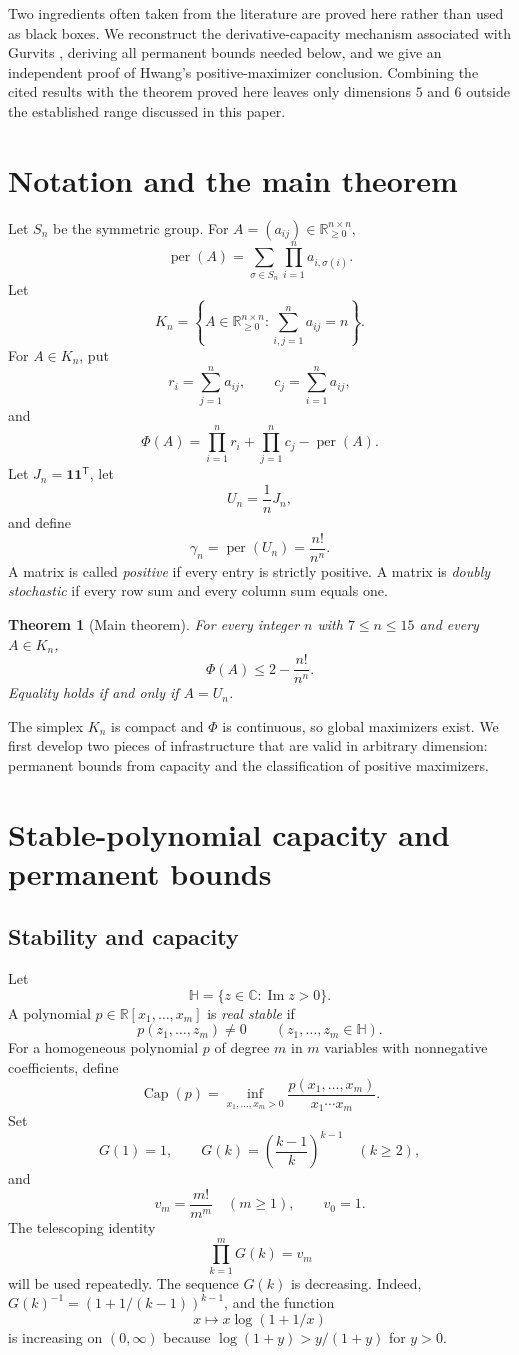 \documentclass[11pt]{article}
\newtheorem{theorem}{Theorem}[section]
\theoremstyle{definition}
\newcommand{\per}{\operatorname{per}}
\newcommand{\pcap}{\operatorname{Cap}}
\newcommand{\Rge}{\mathbb{R}_{\ge 0}}
\newcommand{\1}{\mathbf{1}}
\newcommand{\cH}{\mathbb{H}}
\begin{document}
Two ingredients often taken from the literature are proved here rather than
used as black boxes.  We reconstruct the derivative-capacity mechanism
associated with Gurvits \cite{Gurvits2008}, deriving all permanent bounds
needed below, and we give an independent proof of Hwang's positive-maximizer
conclusion.  Combining the cited results with the theorem proved here leaves
only dimensions $5$ and $6$ outside the established range discussed in this
paper.

\section{Notation and the main theorem}

Let $S_n$ be the symmetric group.  For $A=(a_{ij})\in\Rge^{n\times n}$,
\[
 \per(A)=\sum_{\sigma\in S_n}\prod_{i=1}^n a_{i,\sigma(i)}.
\]
Let
\[
 K_n=\left\{A\in\Rge^{n\times n}:\sum_{i,j=1}^n a_{ij}=n\right\}.
\]
For $A\in K_n$, put
\[
 r_i=\sum_{j=1}^n a_{ij},\qquad c_j=\sum_{i=1}^n a_{ij},
\]
and
\[
 \Phi(A)=\prod_{i=1}^n r_i+\prod_{j=1}^n c_j-\per(A).
\]
Let $J_n=\1\1^{\mathsf T}$, let
\[
 U_n=\frac1nJ_n,
\]
and define
\[
 \gamma_n=\per(U_n)=\frac{n!}{n^n}.
\]
A matrix is called \emph{positive} if every entry is strictly positive.  A matrix is \emph{doubly stochastic} if every row sum and every column sum equals one.

\begin{theorem}[Main theorem]\label{thm:main}
For every integer $n$ with $7\le n\le15$ and every $A\in K_n$,
\[
 \Phi(A)\le 2-\frac{n!}{n^n}.
\]
Equality holds if and only if $A=U_n$.
\end{theorem}

The simplex $K_n$ is compact and $\Phi$ is continuous, so global maximizers exist.  We first develop two pieces of infrastructure that are valid in arbitrary dimension: permanent bounds from capacity and the classification of positive maximizers.

\section{Stable-polynomial capacity and permanent bounds}\label{sec:capacity}

\subsection{Stability and capacity}

Let
\[
 \cH=\{z\in\mathbb C:\operatorname{Im}z>0\}.
\]
A polynomial $p\in\mathbb R[x_1,\dots,x_m]$ is \emph{real stable} if
\[
 p(z_1,\dots,z_m)\ne0
 \qquad(z_1,\dots,z_m\in\cH).
\]
For a homogeneous polynomial $p$ of degree $m$ in $m$ variables with nonnegative coefficients, define
\[
 \pcap(p)=\inf_{x_1,\dots,x_m>0}
 \frac{p(x_1,\dots,x_m)}{x_1\cdots x_m}.
\]
Set
\[
 G(1)=1,
 \qquad
 G(k)=\left(\frac{k-1}{k}\right)^{k-1}\quad(k\ge2),
\]
and
\[
 v_m=\frac{m!}{m^m}\quad(m\ge1),
 \qquad v_0=1.
\]
The telescoping identity
\[
 \prod_{k=1}^mG(k)=v_m
 \tag{3.1}\label{eq:telescoping}
\]
will be used repeatedly.  The sequence $G(k)$ is decreasing.  Indeed,
$G(k)^{-1}=(1+1/(k-1))^{k-1}$, and the function
\[
 x\longmapsto x\log(1+1/x)
\]
is increasing on $(0,\infty)$ because
$\log(1+y)>y/(1+y)$ for $y>0$.
\end{document}
